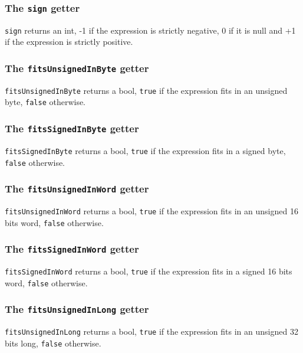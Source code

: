 \documentclass[10pt,openright,twosides,final]{memoir}
\newcommand{\icst}[1]{{\footnotesize\ttfamily\colorbox{light-blue}{#1}}}
\newcommand{\gtlinline}[1]{\colorbox{light-blue}{\lstinline[language=gtl]{#1}}}
\begin{document}
\subsubsection{The \texttt{sign} getter}

\gtlinline{sign} returns an int, \icst{-1} if the expression is strictly negative, \icst{0} if it is null and \icst{+1} if the expression is strictly positive.


\subsubsection{The \texttt{fitsUnsignedInByte} getter}

\gtlinline{fitsUnsignedInByte} returns a bool, \gtlinline{true} if the expression fits in an unsigned byte, \gtlinline{false} otherwise.

\subsubsection{The \texttt{fitsSignedInByte} getter}

\gtlinline{fitsSignedInByte} returns a bool, \gtlinline{true} if the expression fits in a signed byte, \gtlinline{false} otherwise.

\subsubsection{The \texttt{fitsUnsignedInWord} getter}

\gtlinline{fitsUnsignedInWord} returns a bool, \gtlinline{true} if the expression fits in an unsigned 16 bits word, \gtlinline{false} otherwise.

\subsubsection{The \texttt{fitsSignedInWord} getter}

\gtlinline{fitsSignedInWord} returns a bool, \gtlinline{true} if the expression fits in a signed 16 bits word, \gtlinline{false} otherwise.

\subsubsection{The \texttt{fitsUnsignedInLong} getter}

\gtlinline{fitsUnsignedInLong} returns a bool, \gtlinline{true} if the expression fits in an unsigned 32 bits long, \gtlinline{false} otherwise.
\end{document}

